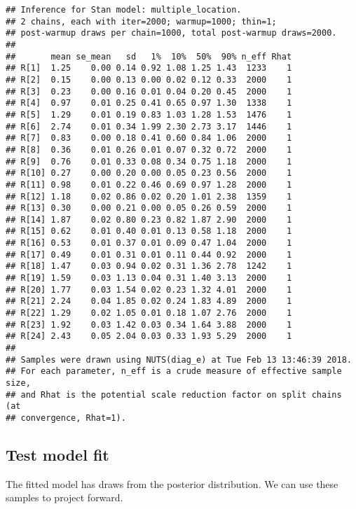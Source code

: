 \documentclass[11pt,]{article}
\begin{document}
\begin{verbatim}
## Inference for Stan model: multiple_location.
## 2 chains, each with iter=2000; warmup=1000; thin=1; 
## post-warmup draws per chain=1000, total post-warmup draws=2000.
## 
##       mean se_mean   sd   1%  10%  50%  90% n_eff Rhat
## R[1]  1.25    0.00 0.14 0.92 1.08 1.25 1.43  1233    1
## R[2]  0.15    0.00 0.13 0.00 0.02 0.12 0.33  2000    1
## R[3]  0.23    0.00 0.16 0.01 0.04 0.20 0.45  2000    1
## R[4]  0.97    0.01 0.25 0.41 0.65 0.97 1.30  1338    1
## R[5]  1.29    0.01 0.19 0.83 1.03 1.28 1.53  1476    1
## R[6]  2.74    0.01 0.34 1.99 2.30 2.73 3.17  1446    1
## R[7]  0.83    0.00 0.18 0.41 0.60 0.84 1.06  2000    1
## R[8]  0.36    0.01 0.26 0.01 0.07 0.32 0.72  2000    1
## R[9]  0.76    0.01 0.33 0.08 0.34 0.75 1.18  2000    1
## R[10] 0.27    0.00 0.20 0.00 0.05 0.23 0.56  2000    1
## R[11] 0.98    0.01 0.22 0.46 0.69 0.97 1.28  2000    1
## R[12] 1.18    0.02 0.86 0.02 0.20 1.01 2.38  1359    1
## R[13] 0.30    0.00 0.21 0.00 0.05 0.26 0.59  2000    1
## R[14] 1.87    0.02 0.80 0.23 0.82 1.87 2.90  2000    1
## R[15] 0.62    0.01 0.40 0.01 0.13 0.58 1.18  2000    1
## R[16] 0.53    0.01 0.37 0.01 0.09 0.47 1.04  2000    1
## R[17] 0.49    0.01 0.31 0.01 0.11 0.44 0.92  2000    1
## R[18] 1.47    0.03 0.94 0.02 0.31 1.36 2.78  1242    1
## R[19] 1.59    0.03 1.13 0.04 0.31 1.40 3.13  2000    1
## R[20] 1.77    0.03 1.54 0.02 0.23 1.32 4.01  2000    1
## R[21] 2.24    0.04 1.85 0.02 0.24 1.83 4.89  2000    1
## R[22] 1.29    0.02 1.05 0.01 0.18 1.07 2.76  2000    1
## R[23] 1.92    0.03 1.42 0.03 0.34 1.64 3.88  2000    1
## R[24] 2.43    0.05 2.04 0.03 0.33 1.93 5.29  2000    1
## 
## Samples were drawn using NUTS(diag_e) at Tue Feb 13 13:46:39 2018.
## For each parameter, n_eff is a crude measure of effective sample size,
## and Rhat is the potential scale reduction factor on split chains (at 
## convergence, Rhat=1).
\end{verbatim}

\subsection{Test model fit}\label{test-model-fit}

The fitted model has draws from the posterior distribution. We can use
these samples to project forward.
\end{document}
